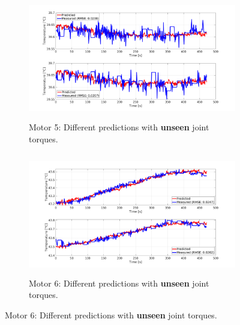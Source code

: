 \documentclass{ifacconf}
\begin{document}
\begin{figure}[t!]
	\begin{subfigure}[t]{0.5\textwidth}
		\centering
		\includegraphics[height=2.1in, width=\linewidth, keepaspectratio]{./pictures/applications/feedback/new/j5_legend_rmse_l_20.png}
		\caption{Motor 5: Different predictions with \textbf{unseen} joint torques.}
	\end{subfigure}%
	\begin{subfigure}[t]{0.5\textwidth}
		\centering
		\includegraphics[height=2.1in, width=\linewidth, keepaspectratio]{./pictures/applications/feedback/new/j6_legend_rmse_l_20.png}
		\caption{Motor 6: Different predictions with \textbf{unseen} joint torques.}
	\end{subfigure}

    \vspace{1ex} 


\end{figure}
\end{document}
